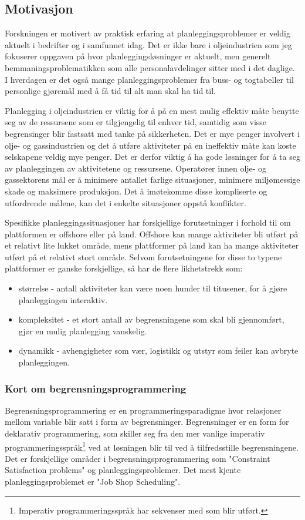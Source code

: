 \subsection{Motivasjon}
Forskningen er motivert av praktisk erfaring at planleggingsproblemer er veldig aktuelt i bedrifter og i samfunnet idag. Det er ikke bare i oljeindustrien som jeg fokuserer oppgaven på hvor planleggingsløsninger er aktuelt, men generelt bemmaningsproblematikken som alle personalavdelinger sitter med i det daglige. I hverdagen er det også mange planleggingsproblemer fra buss- og togtabeller til personlige gjøremål med å få tid til alt man skal ha tid til.

Planlegging i oljeindustrien er viktig for å på en mest mulig effektiv måte benytte seg av de ressursene som er tilgjengelig til enhver tid, samtidig som visse begrensinger blir fastsatt med tanke på sikkerheten. Det er mye penger involvert i olje- og gassindustrien og det å utføre aktiviteter på en ineffektiv måte kan koste selskapene veldig mye penger. Det er derfor viktig å ha gode løsninger for å ta seg av planleggingen av aktivitetene og ressursene. Operatører innen olje- og gassektorens mål er å minimere antallet farlige situasjoner, minimere miljømessige skade og maksimere produksjon. Det å imøtekomme disse kompliserte og utfordrende målene, kan det i enkelte situasjoner oppstå konflikter.

Spesifikke planleggingssituasjoner har forskjellige forutsetninger i forhold til om plattformen er offshore eller på land. Offshore kan mange aktiviteter bli utført på et relativt lite lukket område, mens plattformer på land kan ha mange aktiviteter utført på et relativt stort område. Selvom forutsetningene for disse to typene plattformer er ganske forskjellige, så har de flere likhetstrekk som:
\begin{itemize}
\item størrelse - antall aktiviteter kan være noen hunder til titusener, for å gjøre planleggingen interaktiv.
\item kompleksitet - et stort antall av begrensningene som skal bli gjennomført, gjør en mulig planlegging vanskelig.
\item dynamikk - avhengigheter som vær, logistikk og utstyr som feiler kan avbryte planleggingen.
\end{itemize}

\subsubsection{Kort om begrensningsprogrammering}
Begrensningsprogrammering er en programmeringsparadigme hvor relasjoner mellom variable blir satt i form av begrensninger. Begrensninger er en form for deklarativ programmering, som skiller seg fra den mer vanlige imperativ programmeringsspråk\footnote{Imperativ programmeringsspråk har sekvenser med som blir utført.} ved at løsningen blir til ved å tilfredsstille begrensningene. Det er forskjellige områder i begrensningsprogrammering som "Constraint Satisfaction problems" og planleggingsproblemer. Det mest kjente planleggingsproblemet er "Job Shop Scheduling".\cite{cpwikipedia}

